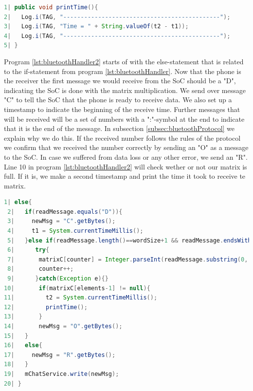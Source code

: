 \documentclass[a4paper, 11pt]{report}
\begin{document}
\begin{lstlisting}[caption={Prints elapsed time for sending matrices},captionpos=b, label={lst:bluetoothPrint}, language=java, float=hbtp]
1| public void printTime(){
2|   Log.i(TAG, "---------------------------------------------");
3|   Log.i(TAG, "Time = " + String.valueOf(t2 - t1));
4|   Log.i(TAG, "---------------------------------------------");
5| }
\end{lstlisting}

Program \ref{lst:bluetoothHandler2} starts of with the else-statement that is related to the if-statement from program \ref{lst:bluetoothHandler}. Now that the phone is the receiver the first message we would receive from the SoC should be a "D", indicating the SoC is done with the matrix multiplication. We send over message "C" to tell the SoC that the phone is ready to receive data. We also set up a timestamp to indicate the beginning of the receive time. Further messages that will be received will be a set of numbers with a ":"-symbol at the end to indicate that it is the end of the message. In subsection \ref{subsec:bluetoothProtocol} we explain why we do this. If the received number follows the rules of the protocol we confirm that we received the number correctly by sending an "O" as a message to the SoC. In case we suffered from data loss or any other error, we send an "R". Line 10 in program \ref{lst:bluetoothHandler2} will check wether or not our matrix is full. If it is, we make a second timestamp and print the time it took to receive te matrix.

\begin{lstlisting}[caption={Bluetooth message handler as receiver},captionpos=b, label={lst:bluetoothHandler2}, language=java, float=ht]
 1| else{
 2|   if(readMessage.equals("D")){
 3|     newMsg = "C".getBytes();
 4|     t1 = System.currentTimeMillis();
 5|   }else if(readMessage.length()==wordSize+1 && readMessage.endsWith(":")){
 6|      try{
 7|       matrixC[counter] = Integer.parseInt(readMessage.substring(0, wordSize));
 8|       counter++;
 9|      }catch(Exception e){}
10|       if(matrixC[elements-1] != null){
11|         t2 = System.currentTimeMillis();
12|         printTime();
13|       }
14|       newMsg = "O".getBytes();
15|   }
16|   else{
17|     newMsg = "R".getBytes();
18|   }
19|   mChatService.write(newMsg);
20| }
\end{lstlisting}
\end{document}
